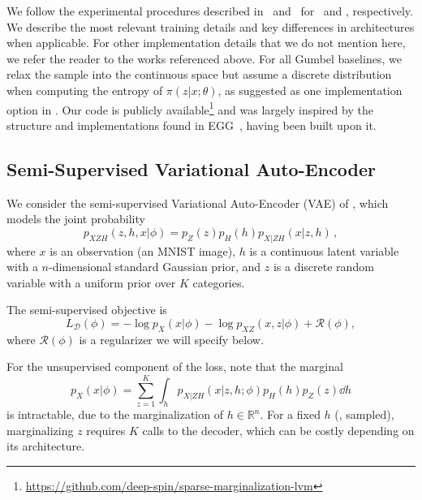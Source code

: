 We follow the experimental procedures described in~\citep{RB19}
and~\citep{Lazaridou2017} for~ and ,
respectively. We describe the most relevant training details and key
differences in architectures when applicable. For other
implementation details that we do not mention here, we refer the
reader to the works referenced above. For all Gumbel baselines, we
relax the sample into the continuous space but assume a discrete
distribution when computing the entropy of $\pi(z |x; \theta)$, as
suggested as one implementation option in \citet{Concrete}. Our code
is publicly available\footnote{
    \url{https://github.com/deep-spin/sparse-marginalization-lvm}} and
was largely inspired by the structure and implementations found in
EGG~\citep{Kharitonov2019}, having been built upon it.

\subsection{Semi-Supervised Variational Auto-Encoder}\label{sec:gen}

\noindent We consider the semi-supervised Variational Auto-Encoder
(VAE) of \citet{KingmaEtAl2014SSVAE}, which models the joint
probability
%
\begin{equation}
    p_{XZH}(z,h,x|\phi)=p_Z(z)p_H(h)p_{X|ZH}(x|z,h)\,,
\end{equation}
%
where $x$ is an
observation (an MNIST image), $h$ is a continuous latent variable
with a $n$-dimensional standard Gaussian prior, and $z$ is a discrete
random variable with a uniform prior over $K$ categories.

The semi-supervised objective is
%
\begin{equation}
    L_{\mathcal D}(\phi) = - \log p_X(x | \phi) - \log p_{XZ}(x, z | \phi) + \mathcal{R}(\phi),
    \label{eq:ss_loss_vae}
\end{equation}
%
where $\mathcal{R}(\phi)$ is a regularizer we will specify below.

For the unsupervised component of the loss, note that the marginal
%
\begin{equation}
    p_X(x | \phi) = \sum_{z=1}^K \int_h p_{X|ZH}(x | z, h; \phi)p_H(h)p_Z(z) \dd h
\end{equation}
%
is intractable, due to the marginalization of $h \in \mathbb
    R^n$. For a fixed $h$ (\eg, sampled), marginalizing $z$ requires $K$
calls to the decoder, which can be costly depending on its
architecture.

